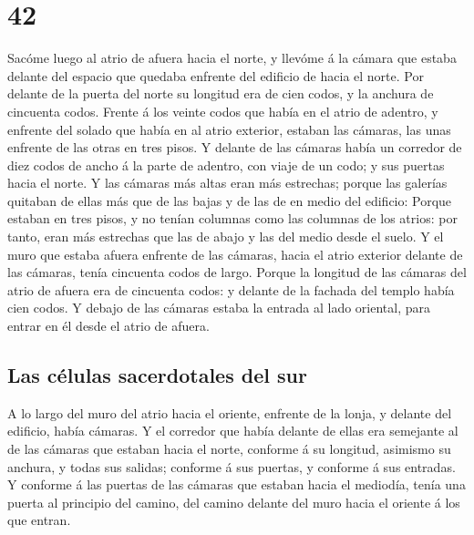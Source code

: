 \hypertarget{section-26-42}{%
\section{42}\label{section-26-42}}

 Sacóme luego al atrio de afuera hacia el norte, y llevóme
á la cámara que estaba delante del espacio que quedaba enfrente del
edificio de hacia el norte.  Por delante de la puerta del
norte su longitud era de cien codos, y la anchura de cincuenta codos.
 Frente á los veinte codos que había en el atrio de
adentro, y enfrente del solado que había en al atrio exterior, estaban
las cámaras, las unas enfrente de las otras en tres pisos.
 Y delante de las cámaras había un corredor de diez codos
de ancho á la parte de adentro, con viaje de un codo; y sus puertas
hacia el norte.  Y las cámaras más altas eran más
estrechas; porque las galerías quitaban de ellas más que de las bajas y
de las de en medio del edificio:  Porque estaban en tres
pisos, y no tenían columnas como las columnas de los atrios: por tanto,
eran más estrechas que las de abajo y las del medio desde el suelo.
 Y el muro que estaba afuera enfrente de las cámaras,
hacia el atrio exterior delante de las cámaras, tenía cincuenta codos de
largo.  Porque la longitud de las cámaras del atrio de
afuera era de cincuenta codos: y delante de la fachada del templo había
cien codos.  Y debajo de las cámaras estaba la entrada al
lado oriental, para entrar en él desde el atrio de afuera.

\hypertarget{las-cuxe9lulas-sacerdotales-del-sur}{%
\subsection{Las células sacerdotales del
sur}\label{las-cuxe9lulas-sacerdotales-del-sur}}

 A lo largo del muro del atrio hacia el oriente, enfrente
de la lonja, y delante del edificio, había cámaras.  Y el
corredor que había delante de ellas era semejante al de las cámaras que
estaban hacia el norte, conforme á su longitud, asimismo su anchura, y
todas sus salidas; conforme á sus puertas, y conforme á sus entradas.
 Y conforme á las puertas de las cámaras que estaban
hacia el mediodía, tenía una puerta al principio del camino, del camino
delante del muro hacia el oriente á los que entran.


